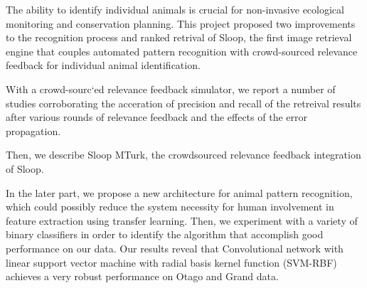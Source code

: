 %
%
%



The ability to identify individual animals is crucial for non-invasive
ecological monitoring and conservation planning. This project proposed two
improvements to the recognition process and ranked retrival of Sloop, the first
image retrieval engine that couples automated pattern recognition with
crowd-sourced relevance feedback for individual animal identification.

With a crowd-sourc`ed relevance feedback simulator, we report a number of
studies corroborating the acceration of precision and recall of the retreival
results after various rounds of relevance feedback and the effects of the error
propagation.

Then, we describe Sloop MTurk, the crowdsourced relevance feedback integration
of Sloop.

In the later part, we propose a new architecture for animal pattern
recognition, which could possibly reduce the system necessity for human
involvement in feature extraction using transfer learning. Then, we experiment
with a variety of binary classifiers in order to identify the algorithm that
accomplish good performance on our data. Our results reveal that Convolutional
network with linear support vector machine with radial basis kernel function
(SVM-RBF) achieves a very robust performance on Otago and Grand data.


